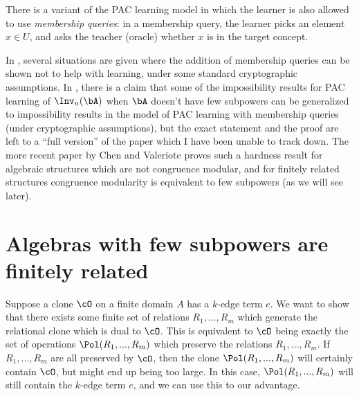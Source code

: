 \begin{rem} There is a variant of the PAC learning model in which the learner is also allowed to use \emph{membership queries}: in a membership query, the learner picks an element $x \in U$, and asks the teacher (oracle) whether $x$ is in the target concept.

In \cite{pac-membership}, several situations are given where the addition of membership queries can be shown not to help with learning, under some standard cryptographic assumptions. In \cite{learnable-gmm}, there is a claim that some of the impossibility results for PAC learning of $\Inv_n(\bA)$ when $\bA$ doesn't have few subpowers can be generalized to impossibility results in the model of PAC learning with membership queries (under cryptographic assumptions), but the exact statement and the proof are left to a ``full version'' of the paper which I have been unable to track down. The more recent paper \cite{membership-query-hardness} by Chen and Valeriote proves such a hardness result for algebraic structures which are not congruence modular, and for finitely related structures congruence modularity is equivalent to few subpowers (as we will see later).
\end{rem}



\section{Algebras with few subpowers are finitely related}

Suppose a clone $\cO$ on a finite domain $A$ has a $k$-edge term $e$. We want to show that there exists some finite set of relations $R_1, ..., R_m$ which generate the relational clone which is dual to $\cO$. This is equivalent to $\cO$ being exactly the set of operations $\Pol(R_1, ..., R_m)$ which preserve the relations $R_1, ..., R_m$. If $R_1, ..., R_m$ are all preserved by $\cO$, then the clone $\Pol(R_1, ..., R_m)$ will certainly contain $\cO$, but might end up being too large. In this case, $\Pol(R_1, ..., R_m)$ will still contain the $k$-edge term $e$, and we can use this to our advantage.

